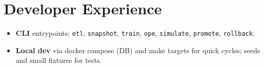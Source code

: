 \section{Developer Experience}
\begin{itemize}
  \item \textbf{CLI} entrypoints: \texttt{etl}, \texttt{snapshot}, \texttt{train}, \texttt{ope}, \texttt{simulate}, \texttt{promote}, \texttt{rollback}.
  \item \textbf{Local dev} via docker compose (DB) and make targets for quick cycles; seeds and small fixtures for tests.
\end{itemize}
